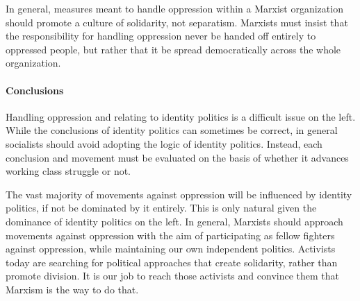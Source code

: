 In general, measures meant to handle oppression within a Marxist organization should promote a culture of solidarity, not separatism. Marxists must insist that the responsibility for handling oppression never be handed off entirely to oppressed people, but rather that it be spread democratically across the whole organization.

\paragraph{Conclusions}

Handling oppression and relating to identity politics is a difficult issue on the left. While the conclusions of identity politics can sometimes be correct, in general socialists should avoid adopting the logic of identity politics. Instead, each conclusion and movement must be evaluated on the basis of whether it advances working class struggle or not.

The vast majority of movements against oppression will be influenced by identity politics, if not be dominated by it entirely. This is only natural given the dominance of identity politics on the left. In general, Marxists should approach movements against oppression with the aim of participating as fellow fighters against oppression, while maintaining our own independent politics. Activists today are searching for political approaches that create solidarity, rather than promote division. It is our job to reach those activists and convince them that Marxism is the way to do that.
